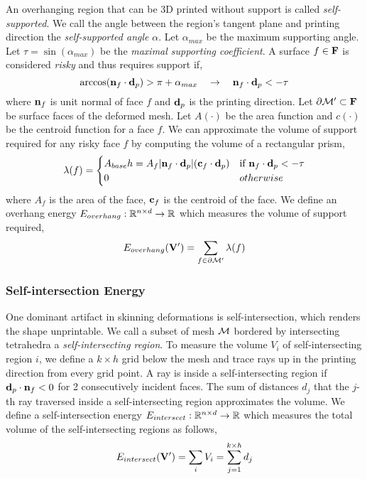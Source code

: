 An overhanging region that can be 3D printed without support is called \textit{self-supported}. We call the angle between the region's tangent plane and printing direction the \textit{self-supported angle} $\alpha$. Let $\alpha_{max}$ be the maximum supporting angle. Let $\tau = \sin(\alpha_{max})$ be the \textit{maximal supporting coefficient}. A surface $f\in \mathbf{F}$ is considered \textit{risky} and thus requires support if,
\[
    \arccos(\mathbf{n}_f \cdot \mathbf{d}_{p}) > \pi + \alpha_{max}
    \quad \rightarrow \quad
    \mathbf{n}_f \cdot \mathbf{d}_{p} < - \tau
\]
where $\mathbf{n}_f$ is unit normal of face $f$ and $\mathbf{d}_{p}$ is the printing direction. Let $\partial \mathcal{M}' \subset \mathbf{F}$ be surface faces of the deformed mesh. Let $A(\cdot)$ be the area function and $c(\cdot)$ be the centroid function for a face $f$. We can approximate the volume of support required for any risky face $f$ by computing the volume of a rectangular prism,
\[
    \lambda(f) = 
    \begin{cases}
        A_{base} h = A_f |\mathbf{n}_f \cdot \mathbf{d}_{p}| (\mathbf{c}_f \cdot \mathbf{d}_{p}) & \text{if } \mathbf{n}_f \cdot \mathbf{d}_{p} < -\tau \\
        0 & otherwise \\
    \end{cases}
\]
where $A_f$ is the area of the face, $\mathbf{c}_f$ is the centroid of the face. We define an overhang energy $E_{overhang}: \mathbb{R}^{n\times d} \to \mathbb{R}$ which measures the volume of support required,
\[
    E_{overhang}(\mathbf{V}') = \sum_{f\in \partial \mathcal{M}'} \lambda(f)
\]

\subsubsection*{Self-intersection Energy}

One dominant artifact in skinning deformations is self-intersection, which renders the shape unprintable. We call a subset of mesh $\mathcal{M}$ bordered by intersecting tetrahedra a \textit{self-intersecting region}. To measure the volume $V_i$ of self-intersecting region $i$, we define a $k\times h$ grid below the mesh and trace rays up in the printing direction from every grid point. A ray is inside a self-intersecting region if $\mathbf{d}_{p} \cdot \mathbf{n}_f < 0$ for 2 consecutively incident faces. The sum of distances $d_j$ that the $j$-th ray traversed inside a self-intersecting region approximates the volume. We define a self-intersection energy $E_{intersect}: \mathbb{R}^{n\times d} \to \mathbb{R}$ which measures the total volume of the self-intersecting regions as follows,
\[
    E_{intersect}(\mathbf{V}') = \sum_i V_i = \sum_{j=1}^{k\times h} d_j
\]

